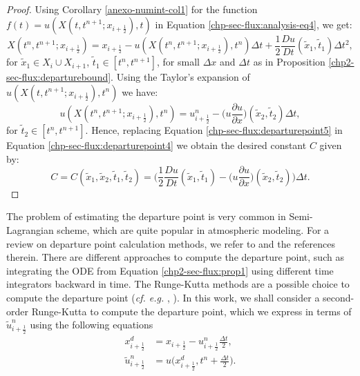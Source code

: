\begin{proof}
Using Corollary \ref{anexo-numint-col1} for the function $f(t) = u(X(t,t^{n+1};x_{i+\frac{1}{2}}),t)$
in Equation  \eqref{chp-sec-flux:analysis-eq4}, we get:
\begin{equation}
	\label{chp-sec-flux:departurepoint4}
	X(t^n,t^{n+1};x_{i+\frac{1}{2}}) = x_{i+\frac{1}{2}} - u(X(t^n,t^{n+1};x_{i+\frac{1}{2}}),t^n)\Delta t + \frac{1}{2}\frac{Du}{Dt}(\tilde{x}_1,\tilde{t}_1)\Delta t^2,
\end{equation}
for $\tilde{x}_1 \in X_i \cup X_{i+1}$, $\tilde{t}_1 \in [t^n, t^{n+1}]$, for small $\Delta x$ and $\Delta t$ as in Proposition \ref{chp2-sec-flux:departurebound}.
Using the Taylor's expansion of $u(X(t,t^{n+1};x_{i+\frac{1}{2}}),t^n)$ we have:
\begin{equation}
	\label{chp-sec-flux:departurepoint5}
	u(X(t^n,t^{n+1};x_{i+\frac{1}{2}}),t^n) = u^n_{i+\frac{1}{2}} - \bigg(u\frac{\partial u}{\partial x}\bigg)(\tilde{x}_2,\tilde{t}_2)\Delta t,
\end{equation}
for $\tilde{t}_2 \in [t^n, t^{n+1}]$.
Hence, replacing Equation \eqref{chp-sec-flux:departurepoint5} in Equation \eqref{chp-sec-flux:departurepoint4} 
we obtain the desired constant $C$ given by:
\begin{equation}
	\label{chp-sec-flux:departurepoint6}
	C =  C(\tilde{x}_1, \tilde{x}_2, \tilde{t}_1, \tilde{t}_2) = 
	\bigg( \frac{1}{2}\frac{Du}{Dt}(\tilde{x}_1,\tilde{t}_1) - \bigg(u\frac{\partial u}{\partial x}\bigg)(\tilde{x}_2,\tilde{t}_2)\bigg)\Delta t.
\end{equation}
\end{proof}
The problem of estimating the departure point is very common in Semi-Lagrangian scheme,
which are quite popular in atmospheric modeling.
For a review on departure point calculation methods, we refer to  \citet[Chapter 3]{tumolo:2011} and the references therein. 
There are different approaches to compute the departure point, such as integrating the ODE from Equation \ref{chp2-sec-flux:prop1}
using different time integrators \citep{durran:2011} backward in time.
The Runge-Kutta methods are a possible choice to compute the departure point (\textit{cf. e.g.} \citet{guo:2014}, \citet{lu:2022}). In this work,
we shall consider a second-order Runge-Kutta to compute the departure point, which we express in terms of $\tilde{u}^n_{i+\frac{1}{2}}$ 
using the following equations \citep{durran:2010}
\begin{align}
	\label{chp-sec-flux:dp_RK2}		
	x^{d}_{i+\frac{1}{2}} &= x_{i+\frac{1}{2}} - u_{i+\frac{1}{2}}^n \frac{\Delta t}{2}, \nonumber \\
	\tilde{u}^n_{i+\frac{1}{2}} &= u\bigg(x^{d}_{i+\frac{1}{2}}, t^n + \frac{\Delta t}{2}\bigg).
\end{align}
